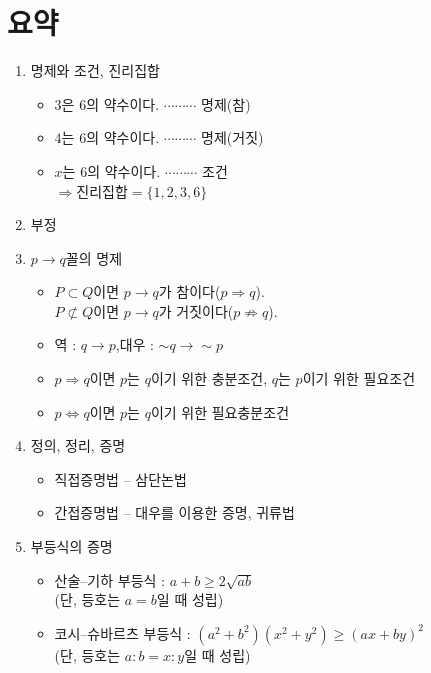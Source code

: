 \documentclass{oblivoir}
\begin{document}
\section*{요약}
\begin{enumerate}[label=\arabic*.,itemsep=15pt]
\item
명제와 조건, 진리집합
\begin{itemize}
\item
\(3\)은 \(6\)의 약수이다. \(\cdots\cdots\cdots\) 명제(참)
\item
\(4\)는 \(6\)의 약수이다. \(\cdots\cdots\cdots\) 명제(거짓)
\item
\(x\)는 \(6\)의 약수이다. \(\cdots\cdots\cdots\) 조건\\
\(\Rightarrow\text{진리집합}=\{1,2,3,6\}\) 
\end{itemize}
\item
부정
\item
\(p\to q\)꼴의 명제
\begin{itemize}
\item
\(P\subset Q\)이면 \(p\to q\)가 참이다(\(p\Longrightarrow q\)).\\
\(P\not\subset Q\)이면 \(p\to q\)가 거짓이다(\(p\not\Longrightarrow q\)).
\item
역 : \(q\to p\),\qquad 대우 : \(\sim q\to\sim p\)
\item
\(p\Longrightarrow q\)이면
\(p\)는 \(q\)이기 위한 충분조건,
\(q\)는 \(p\)이기 위한 필요조건
\item
\(p\iff q\)이면
\(p\)는 \(q\)이기 위한 필요충분조건
\end{itemize}
\item
정의, 정리, 증명
\begin{itemize}
\item
직접증명법 -- 삼단논법
\item
간접증명법 -- 대우를 이용한 증명, 귀류법
\end{itemize}
\item
부등식의 증명
\begin{itemize}
\item
산술--기하 부등식 :
\(a+b\ge2\sqrt{ab}\)\\
(단, 등호는 \(a=b\)일 때 성립)
\item
코시--슈바르츠 부등식 :
\((a^2+b^2)(x^2+y^2)\ge(ax+by)^2\)\\
(단, 등호는 \(a:b=x:y\)일 때 성립)
\end{itemize}
\end{enumerate}
\end{document}
